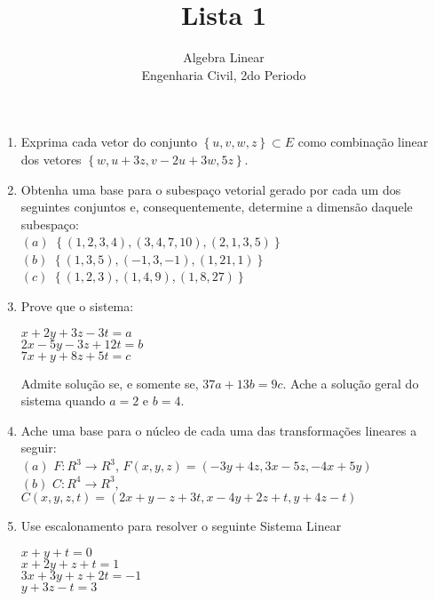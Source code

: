 \documentclass[12pt,openright,oneside,a4paper,english,french,spanish,brazil]{abntex2}
\begin{document}
\author{Algebra Linear\\ Engenharia Civil, 2do Periodo}
\title{Lista 1}

\maketitle
\begin{enumerate}[]

\item Exprima cada vetor do conjunto $\left\lbrace u, v, w, z \right\rbrace \subset E$ como combinação linear dos vetores $\left\lbrace w, u+3z, v-2u+3w,5z \right\rbrace$.

\item Obtenha uma base para o subespaço vetorial gerado por cada um dos seguintes conjuntos e, consequentemente, determine a dimensão daquele subespaço:\\

$(a)$ $\left\lbrace (1,2,3,4), (3,4,7,10), (2,1,3,5) \right\rbrace$\\

$(b)$ $\left\lbrace (1,3,5), (-1,3,-1), (1,21,1) \right\rbrace$ \\

$(c)$ $\left\lbrace (1,2,3), (1,4,9), (1,8,27) \right\rbrace$ 
\item
Prove que o sistema:
\begin{center}
	$x+2y+3z-3t=a$\\
	$2x-5y-3z+12t=b$\\
	$7x+y+8z+5t=c$\\
\end{center}
Admite solução se, e somente se, $37a+13b=9c$. Ache a solução geral do sistema quando $a=2$ e $b=4$.

\item Ache uma base para o núcleo de cada uma das transformações lineares a seguir:\\
$(a)$ $F:R^{3}\longrightarrow R^{3}$, $F(x,y,z)=(-3y+4z,3x-5z,-4x+5y)$\\

$(b)$ $C:R^{4}\longrightarrow R^{3}$, $C(x,y,z,t)=(2x+y-z+3t,x-4y+2z+t,y+4z-t)$
\item Use escalonamento para resolver o seguinte Sistema Linear
\begin{center}
	$x+y+t=0$\\
	$x+2y+z+t=1$\\
	$3x+3y+z+2t=-1$\\
	$y+3z-t=3$
\end{center}


\end{enumerate}
\end{document}
